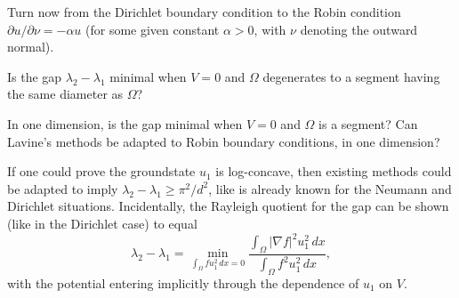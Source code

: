 \documentclass[12pt,letterpaper, reqno]{aimpl}
\begin{document}
\begin{problemblock}
Turn now from the Dirichlet boundary condition to the Robin
condition $\partial u / \partial \nu = -\alpha u$ (for some given
constant $\alpha > 0$, with $\nu$ denoting the outward normal).

\begin{problem}[3.75]
Is
the gap $\lambda_2 - \lambda_1$ minimal when $V=0$ and $\Omega$
degenerates to a segment having the same diameter as $\Omega$?

In one dimension, is the gap minimal when $V=0$ and $\Omega$ is a
segment? Can Lavine's methods be adapted to Robin boundary
conditions, in one dimension?
\end{problem}

If one could prove the groundstate $u_1$ is log-concave, then
existing methods could be adapted to imply $\lambda_2 - \lambda_1
\geq \pi^2/d^2$, like is already known for the Neumann and Dirichlet
situations. Incidentally, the Rayleigh quotient for the gap can be
shown (like in the Dirichlet case) to equal
\[
\lambda_2 - \lambda_1 = \min_{\int_\Omega f u_1^2 \, dx = 0}
\frac{\int_\Omega |\nabla f|^2 u_1^2 \, dx}{\int_\Omega f^2 u_1^2 \,
dx} ,
\]
with the potential entering implicitly through the dependence of
$u_1$ on $V$.

\end{problemblock}
\end{document}
